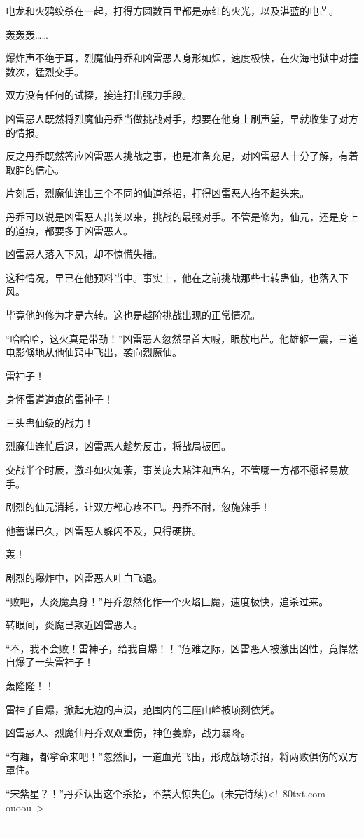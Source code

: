 \begin{this_body}
电龙和火鸦绞杀在一起，打得方圆数百里都是赤红的火光，以及湛蓝的电芒。

轰轰轰……

爆炸声不绝于耳，烈魔仙丹乔和凶雷恶人身形如烟，速度极快，在火海电狱中对撞数次，猛烈交手。

双方没有任何的试探，接连打出强力手段。

凶雷恶人既然将烈魔仙丹乔当做挑战对手，想要在他身上刷声望，早就收集了对方的情报。

反之丹乔既然答应凶雷恶人挑战之事，也是准备充足，对凶雷恶人十分了解，有着取胜的信心。

片刻后，烈魔仙连出三个不同的仙道杀招，打得凶雷恶人抬不起头来。

丹乔可以说是凶雷恶人出关以来，挑战的最强对手。不管是修为，仙元，还是身上的道痕，都要多于凶雷恶人。

凶雷恶人落入下风，却不惊慌失措。

这种情况，早已在他预料当中。事实上，他在之前挑战那些七转蛊仙，也落入下风。

毕竟他的修为才是六转。这也是越阶挑战出现的正常情况。

“哈哈哈，这火真是带劲！”凶雷恶人忽然昂首大喊，眼放电芒。他雄躯一震，三道电影倏地从他仙窍中飞出，袭向烈魔仙。

雷神子！

身怀雷道道痕的雷神子！

三头蛊仙级的战力！

烈魔仙连忙后退，凶雷恶人趁势反击，将战局扳回。

交战半个时辰，激斗如火如荼，事关庞大赌注和声名，不管哪一方都不愿轻易放手。

剧烈的仙元消耗，让双方都心疼不已。丹乔不耐，忽施辣手！

他蓄谋已久，凶雷恶人躲闪不及，只得硬拼。

轰！

剧烈的爆炸中，凶雷恶人吐血飞退。

“败吧，大炎魔真身！”丹乔忽然化作一个火焰巨魔，速度极快，追杀过来。

转眼间，炎魔已欺近凶雷恶人。

“不，我不会败！雷神子，给我自爆！！”危难之际，凶雷恶人被激出凶性，竟悍然自爆了一头雷神子！

轰隆隆！！

雷神子自爆，掀起无边的声浪，范围内的三座山峰被顷刻依凭。

凶雷恶人、烈魔仙丹乔双双重伤，神色萎靡，战力暴降。

“有趣，都拿命来吧！”忽然间，一道血光飞出，形成战场杀招，将两败俱伤的双方罩住。

“宋紫星？！”丹乔认出这个杀招，不禁大惊失色。(未完待续)<!--80txt.com-ouoou-->

------------

\end{this_body}

